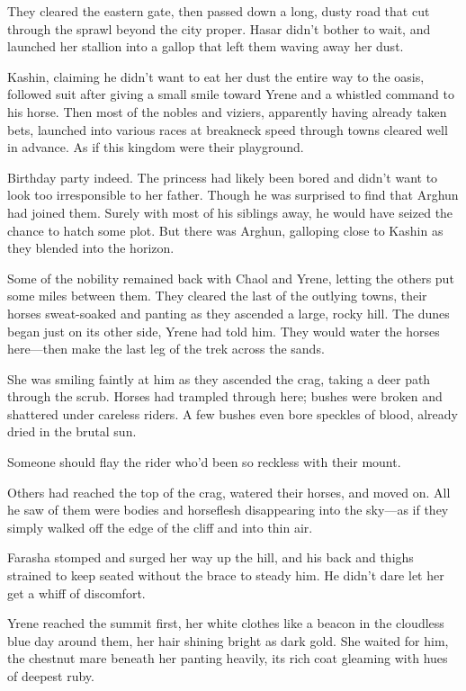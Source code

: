 They cleared the eastern gate, then passed down a long, dusty road that cut through the sprawl beyond the city proper.
Hasar didn't bother to wait, and launched her stallion into a gallop that left them waving away her dust.

Kashin, claiming he didn't want to eat her dust the entire way to the oasis, followed suit after giving a small smile toward Yrene and a whistled command to his horse.
Then most of the nobles and viziers, apparently having already taken bets, launched into various races at breakneck speed through towns cleared well in advance.
As if this kingdom were their playground.

Birthday party indeed.
The princess had likely been bored and didn't want to look too irresponsible to her father.
Though he was surprised to find that Arghun had joined them.
Surely with most of his siblings away, he would have seized the chance to hatch some plot.
But there was Arghun, galloping close to Kashin as they blended into the horizon.

Some of the nobility remained back with Chaol and Yrene, letting the others put some miles between them.
They cleared the last of the outlying towns, their horses sweat-soaked and panting as they ascended a large, rocky hill.
The dunes began just on its other side, Yrene had told him.
They would water the horses here---then make the last leg of the trek across the sands.

She was smiling faintly at him as they ascended the crag, taking a deer path through the scrub.
Horses had trampled through here; bushes were broken and shattered under careless riders.
A few bushes even bore speckles of blood, already dried in the brutal sun.

Someone should flay the rider who'd been so reckless with their mount.

Others had reached the top of the crag, watered their horses, and moved on.
All he saw of them were bodies and horseflesh disappearing into the sky---as if they simply walked off the edge of the cliff and into thin air.

Farasha stomped and surged her way up the hill, and his back and thighs strained to keep seated without the brace to steady him.
He didn't dare let her get a whiff of discomfort.

Yrene reached the summit first, her white clothes like a beacon in the cloudless blue day around them, her hair shining bright as dark gold.
She waited for him, the chestnut mare beneath her panting heavily, its rich coat gleaming with hues of deepest ruby.

